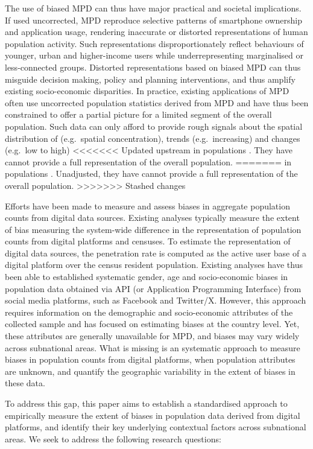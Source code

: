 \documentclass[]{rsos}%
\begin{document}
The use of biased MPD can thus have major practical and societal
implications. If used uncorrected, MPD reproduce selective patterns of
smartphone ownership and application usage, rendering inaccurate or
distorted representations of human population activity. Such
representations disproportionately reflect behaviours of younger, urban
and higher-income users while underrepresenting marginalised or
less-connected groups. Distorted representations based on biased MPD can
thus misguide decision making, policy and planning interventions, and
thus amplify existing socio-economic disparities. In practice, existing
applications of MPD often use uncorrected population statistics derived
from MPD and have thus been constrained to offer a partial picture for a
limited segment of the overall population. Such data can only afford to
provide rough signals about the spatial distribution of (e.g.~spatial
concentration), trends (e.g.~increasing) and changes (e.g.~low to high)
<<<<<<< Updated upstream
in populations \citep{rowe22-sensing-ukraine}. They have cannot provide a
full representation of the overall population.
=======
in populations \citep{rowe22-sensing-ukraine}. Unadjusted, they have cannot
provide a full representation of the overall population.
>>>>>>> Stashed changes

Efforts have been made to measure and assess biases in aggregate
population counts from digital data sources. Existing analyses typically
measure the extent of bias measuring the system-wide difference in the
representation of population counts from digital platforms and censuses.
To estimate the representation of digital data sources, the penetration
rate is computed as the active user base of a digital platform over the
census resident population. Existing analyses have thus been able to
established systematic gender, age and socio-economic biases in
population data obtained via API (or Application Programming Interface)
from social media platforms, such as Facebook and Twitter/X. However,
this approach requires information on the demographic and socio-economic
attributes of the collected sample and has focused on estimating biases
at the country level. Yet, these attributes are generally unavailable
for MPD, and biases may vary widely across subnational areas. What is
missing is an systematic approach to measure biases in population counts
from digital platforms, when population attributes are unknown, and
quantify the geographic variability in the extent of biases in these
data.

To address this gap, this paper aims to establish a standardised
approach to empirically measure the extent of biases in population data
derived from digital platforms, and identify their key underlying
contextual factors across subnational areas. We seek to address the
following research questions:
\end{document}
